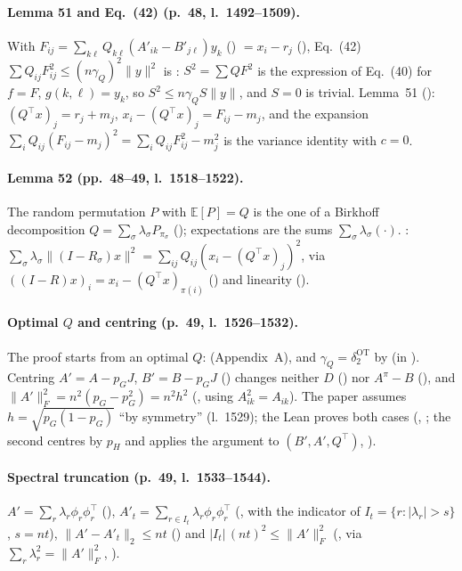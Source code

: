 \paragraph{Lemma 51 and Eq.~(42) (p.~48, l.~1492--1509).} With $F_{ij}=\sum_{k\ell}Q_{k\ell}(A'_{ik}-B'_{j\ell})y_k$
() $=x_i-r_j$ (), Eq.~(42) $\sum Q_{ij}F_{ij}^2\le(n\gamma_Q)^2\|y\|^2$ is :
$S^2=\sum QF^2$ is the expression of Eq.~(40) for $f=F$, $g(k,\ell)=y_k$, so $S^2\le n\gamma_Q S\|y\|$, and
$S=0$ is trivial. Lemma~51 (): $(Q^\top x)_j=r_j+m_j$, $x_i-(Q^\top x)_j=F_{ij}-m_j$, and the
expansion $\sum_iQ_{ij}(F_{ij}-m_j)^2=\sum_iQ_{ij}F_{ij}^2-m_j^2$ is the variance identity
 with $c=0$.

\paragraph{Lemma 52 (pp.~48--49, l.~1518--1522).} The random permutation $P$ with $\mathbb E[P]=Q$ is the one of a Birkhoff
decomposition $Q=\sum_\sigma\lambda_\sigma P_{\pi_\sigma}$ (); expectations are
the sums $\sum_\sigma\lambda_\sigma(\cdot)$. : $\sum_\sigma\lambda_\sigma\|(I-R_\sigma)x\|^2=
\sum_{ij}Q_{ij}(x_i-(Q^\top x)_j)^2$, via $((I-R)x)_i=x_i-(Q^\top x)_{\pi(i)}$ () and
linearity ().

\paragraph{Optimal $Q$ and centring (p.~49, l.~1526--1532).} The proof starts from an optimal $Q$:
 (Appendix~A), and $\gamma_Q=\delta^{\mathrm{OT}}_2$ by 
(in ). Centring $A'=A-p_GJ$, $B'=B-p_GJ$ () changes neither $D$
() nor $A^\pi-B$ (), and $\|A'\|_F^2=n^2(p_G-p_G^2)=n^2h^2$
(, using $A_{ik}^2=A_{ik}$). The paper assumes $h=\sqrt{p_G(1-p_G)}$ ``by symmetry'' (l.~1529);
the Lean proves both cases (, ; the second centres by
$p_H$ and applies the argument to $(B',A',Q^\top)$, ).

\paragraph{Spectral truncation (p.~49, l.~1533--1544).} $A'=\sum_r\lambda_r\phi_r\phi_r^\top$
(), $A'_t=\sum_{r\in I_t}\lambda_r\phi_r\phi_r^\top$ (, with the indicator
 of $I_t=\{r:|\lambda_r|>s\}$, $s=nt$), $\|A'-A'_t\|_2\le nt$ () and
$|I_t|\,(nt)^2\le\|A'\|_F^2$ (, via $\sum_r\lambda_r^2=\|A'\|_F^2$,
).

